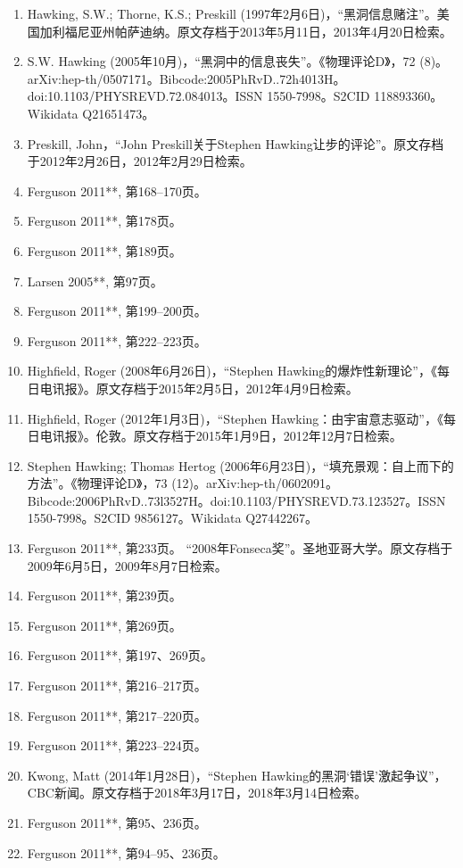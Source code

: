 \begin{enumerate}
\item Hawking, S.W.; Thorne, K.S.; Preskill (1997年2月6日)，“黑洞信息赌注”。美国加利福尼亚州帕萨迪纳。原文存档于2013年5月11日，2013年4月20日检索。  
\item S.W. Hawking (2005年10月)，“黑洞中的信息丧失”。《物理评论D》，72 (8)。arXiv:hep-th/0507171。Bibcode:2005PhRvD..72h4013H。doi:10.1103/PHYSREVD.72.084013。ISSN 1550-7998。S2CID 118893360。Wikidata Q21651473。  
\item Preskill, John，“John Preskill关于Stephen Hawking让步的评论”。原文存档于2012年2月26日，2012年2月29日检索。  
\item Ferguson 2011**, 第168–170页。  
\item Ferguson 2011**, 第178页。  
\item Ferguson 2011**, 第189页。  
\item Larsen 2005**, 第97页。  
\item Ferguson 2011**, 第199–200页。  
\item Ferguson 2011**, 第222–223页。  
\item Highfield, Roger (2008年6月26日)，“Stephen Hawking的爆炸性新理论”，《每日电讯报》。原文存档于2015年2月5日，2012年4月9日检索。  
\item Highfield, Roger (2012年1月3日)，“Stephen Hawking：由宇宙意志驱动”，《每日电讯报》。伦敦。原文存档于2015年1月9日，2012年12月7日检索。  
\item Stephen Hawking; Thomas Hertog (2006年6月23日)，“填充景观：自上而下的方法”。《物理评论D》，73 (12)。arXiv:hep-th/0602091。Bibcode:2006PhRvD..73l3527H。doi:10.1103/PHYSREVD.73.123527。ISSN 1550-7998。S2CID 9856127。Wikidata Q27442267。  
\item Ferguson 2011**, 第233页。  
“2008年Fonseca奖”。圣地亚哥大学。原文存档于2009年6月5日，2009年8月7日检索。  
\item Ferguson 2011**, 第239页。  
\item Ferguson 2011**, 第269页。  
\item Ferguson 2011**, 第197、269页。  
\item Ferguson 2011**, 第216–217页。  
\item Ferguson 2011**, 第217–220页。  
\item Ferguson 2011**, 第223–224页。  
\item Kwong, Matt (2014年1月28日)，“Stephen Hawking的黑洞‘错误’激起争议”，CBC新闻。原文存档于2018年3月17日，2018年3月14日检索。  
\item Ferguson 2011**, 第95、236页。  
\item Ferguson 2011**, 第94–95、236页。  

\end{enumerate}
